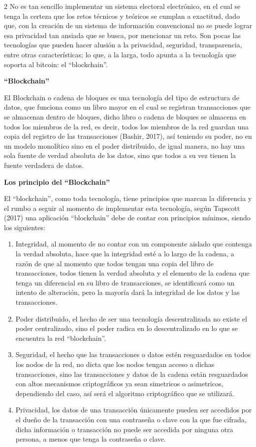 \documentclass[12pt,spanish,Letterpaper,openany]{book}
\begin{document}
\begin {multicols}{2}
No es tan sencillo implementar un sistema electoral electrónico, en el cual se tenga la certeza que los retos técnicos y teóricos se cumplan a exactitud, dado que, con la creación de un sistema de información convencional no se puede lograr esa privacidad tan ansiada que se busca, por mencionar un reto. Son pocas las tecnologías que pueden hacer alusión a la privacidad, seguridad, transparencia, entre otras características; lo que, a la larga, todo apunta a la tecnología que soporta al bitcoin: el ``blockchain''.

\textbf{``Blockchain''}

El Blockchain o cadena de bloques es una tecnología del tipo de estructura de datos, que funciona como un libro mayor en el cual se registran transacciones que se almacenan dentro de bloques, dicho libro o cadena de bloques se almacena en todos los miembros de la red, es decir, todos los miembros de la red guardan una copia del registro de las transacciones (Bashir, 2017), así teniendo su poder, no en un modelo monolítico sino en el poder distribuido, de igual manera, no hay una sola fuente de verdad absoluta de los datos, sino que todos a su vez tienen la fuente verdadera de datos.

\textbf{Los principio del ``Blockchain''}

El ``blockchain'', como toda tecnología, tiene principios que marcan la diferencia y el rumbo a seguir al momento de implementar esta tecnología, según Tapscott (2017) una aplicación ``blockchain'' debe de contar con principios mínimos, siendo los siguientes:

\begin{enumerate}
\def\labelenumi{\arabic{enumi}.}
\item
  Integridad, al momento de no contar con un componente aislado que contenga la verdad absoluta, hace que la integridad esté a lo largo de la cadena, a razón de que al momento que todos tengan una copia del libro de transacciones, todos tienen la verdad absoluta y el elemento de la cadena que tenga un diferencial en su libro de transacciones, se identificará como un intento de alteración, pero la mayoría dará la integridad de los datos y las transacciones.
\item
  Poder distribuido, el hecho de ser una tecnología descentralizada no existe el poder centralizado, sino el poder radica en lo descentralizado en lo que se encuentra la red ``blockchain''.
\item
  Seguridad, el hecho que las transacciones o datos estén resguardados en todos los nodos de la red, no dicta que los nodos tengan acceso a dichas transacciones, sino las transacciones y datos de la cadena están resguardados con altos mecanismos criptográficos ya sean simetricos o asimetricos, dependiendo del caso, así será el algoritmo criptográfico que se utilizará.
\item
  Privacidad, los datos de una transacción únicamente pueden ser accedidos por el dueño de la transacción con una contraseña o clave con la que fue cifrada, dicha información o transacción no puede ser accedida por ninguna otra persona, a menos que tenga la contraseña o clave.
\end{enumerate}


\end{multicols}
\end{document}
